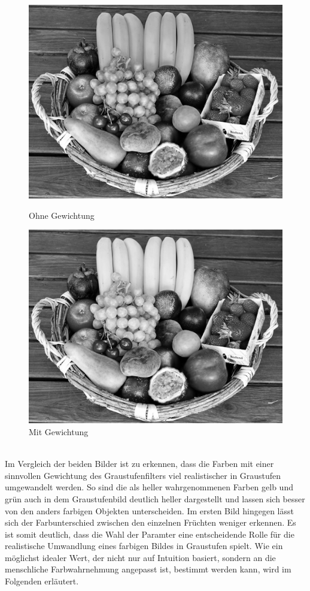\documentclass[course=erap]{aspdoc}
\begin{document}
	\begin{figure}[h]
		\begin{minipage}{0.49\linewidth}
			\centering
			\includegraphics[scale=0.3]{Images/fruit_basket_grey_standard.png}
			\caption{Ohne Gewichtung}
		\end{minipage}
		\centering
		\begin{minipage}{0.49\linewidth}
			\centering
			\includegraphics[scale=0.3]{Images/fruit_basket_grey_improved.png}
			\caption{Mit Gewichtung}
		\end{minipage}
	\end{figure}\\
	
	\noindent Im Vergleich der beiden Bilder ist zu erkennen, dass die Farben mit einer sinnvollen Gewichtung des Graustufenfilters viel realistischer in Graustufen umgewandelt werden. So sind die als heller wahrgenommenen Farben gelb und grün auch in dem Graustufenbild deutlich heller dargestellt und lassen sich besser von den anders farbigen Objekten unterscheiden. Im ersten Bild hingegen lässt sich der Farbunterschied zwischen den einzelnen Früchten weniger erkennen. Es ist somit deutlich, dass die Wahl der Paramter eine entscheidende Rolle für die realistische Umwandlung eines farbigen Bildes in Graustufen spielt. Wie ein möglichst idealer Wert, der nicht nur auf Intuition basiert, sondern an die menschliche Farbwahrnehmung angepasst ist, bestimmt werden kann, wird im Folgenden erläutert.
\end{document}
